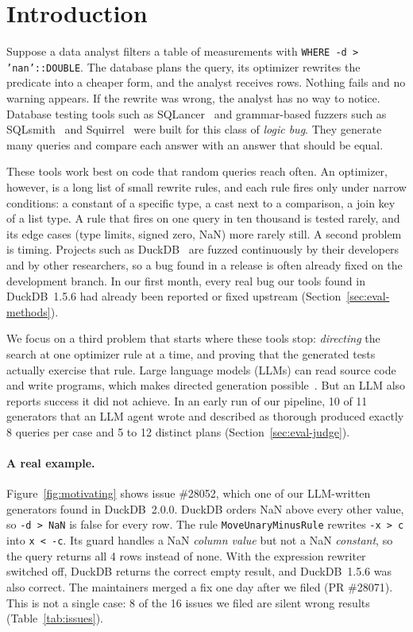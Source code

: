 \section{Introduction}
\label{sec:intro}

Suppose a data analyst filters a table of measurements with \texttt{WHERE -d > 'nan'::DOUBLE}. The database plans the
query, its optimizer rewrites the predicate into a cheaper form, and the analyst receives rows. Nothing fails and no
warning appears. If the rewrite was wrong, the analyst has no way to notice. Database testing tools such as
SQLancer~\cite{rigger2020tlp,rigger2020norec} and grammar-based fuzzers such as SQLsmith~\cite{sqlsmith} and
Squirrel~\cite{zhong2020squirrel} were built for this class of \emph{logic bug}. They generate many queries and compare
each answer with an answer that should be equal.

These tools work best on code that random queries reach often. An optimizer, however, is a long list of small rewrite
rules, and each rule fires only under narrow conditions: a constant of a specific type, a cast next to a comparison, a
join key of a list type. A rule that fires on one query in ten thousand is tested rarely, and its edge cases (type
limits, signed zero, NaN) more rarely still. A second problem is timing. Projects such as
DuckDB~\cite{raasveldt2019duckdb} are fuzzed continuously by their developers and by other researchers, so a bug found
in a release is often already fixed on the development branch. In our first month, every real bug our tools found in
DuckDB~1.5.6 had already been reported or fixed upstream (Section~\ref{sec:eval-methods}).

We focus on a third problem that starts where these tools stop: \emph{directing} the search at one optimizer rule at a
time, and proving that the generated tests actually exercise that rule. Large language models (LLMs) can read source
code and write programs, which makes directed generation possible~\cite{yang2024whitefox,xia2024fuzz4all}. But an LLM
also reports success it did not achieve. In an early run of our pipeline, 10 of 11 generators that an LLM agent wrote
and described as thorough produced exactly 8 queries per case and 5 to 12 distinct plans
(Section~\ref{sec:eval-judge}).

\paragraph{A real example.} Figure~\ref{fig:motivating} shows issue \#28052, which one of our LLM-written generators
found in DuckDB~2.0.0. DuckDB orders NaN above every other value, so \texttt{-d > NaN} is false for every row. The rule
\texttt{MoveUnaryMinusRule} rewrites \texttt{-x > c} into \texttt{x < -c}. Its guard handles a NaN \emph{column value}
but not a NaN \emph{constant}, so the query returns all 4 rows instead of none. With the expression rewriter switched
off, DuckDB returns the correct empty result, and DuckDB~1.5.6 was also correct. The maintainers merged a fix one day
after we filed (PR \#28071). This is not a single case: 8 of the 16 issues we filed are silent wrong results
(Table~\ref{tab:issues}).

